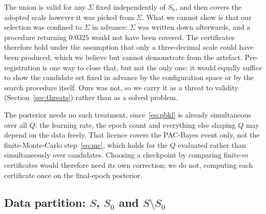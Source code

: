 The union is
valid for any $\Sigma$ fixed independently of $S_{\mathrm b}$, and then covers the
adopted scale however it was picked from $\Sigma$. What we cannot show is that our
selection was confined to $\Sigma$ in advance: $\Sigma$ was written down
afterwards, and a procedure returning $0.0325$ would not have been covered. The
certificates therefore hold under the assumption that only a three-decimal scale
could have been produced, which we believe but cannot demonstrate from the
artefact. Pre-registration is one way to close that, but not the only one: it
would equally suffice to show the candidate set fixed in advance by the
configuration space or by the search procedure itself. Ours was not, so we carry
it as a threat to validity (Section~\ref{sec:threats}) rather than as a solved
problem.

The posterior needs no such treatment, since~\eqref{eq:pbkl} is already
simultaneous over all $Q$: the learning rate, the epoch count and everything else
shaping $Q$ may depend on the data freely. That licence covers the PAC-Bayes
event only, not the finite-Monte-Carlo step~\eqref{eq:mc}, which holds for the
$Q$ evaluated rather than simultaneously over candidates. Choosing a checkpoint
by comparing finite-$m$ certificates would therefore need its own correction; we
do not, computing each certificate once on the final-epoch posterior.

\subsection{Data partition: \texorpdfstring{$S$, $S_0$ and $S\setminus
S_0$}{S, S0 and S minus S0}}\label{sec:partition}


